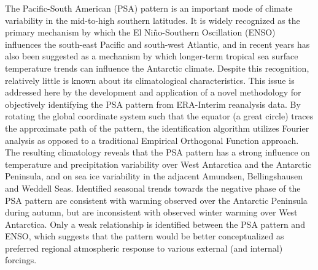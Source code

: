 The Pacific-South American (PSA) pattern is an important mode of climate variability in the mid-to-high southern latitudes. It is widely recognized as the primary mechanism by which the El Ni\~{n}o-Southern Oscillation (ENSO) influences the south-east Pacific and south-west Atlantic, and in recent years has also been suggested as a mechanism by which longer-term tropical sea surface temperature trends can influence the Antarctic climate. Despite this recognition, relatively little is known about its climatological characteristics. This issue is addressed here by the development and application of a novel methodology for objectively identifying the PSA pattern from ERA-Interim reanalysis data. By rotating the global coordinate system such that the equator (a great circle) traces the approximate path of the pattern, the identification algorithm utilizes Fourier analysis as opposed to a traditional Empirical Orthogonal Function approach. The resulting climatology reveals that the PSA pattern has a strong influence on temperature and precipitation variability over West Antarctica and the Antarctic Peninsula, and on sea ice variability in the adjacent Amundsen, Bellingshausen and Weddell Seas. Identified seasonal trends towards the negative phase of the PSA pattern are consistent with warming observed over the Antarctic Peninsula during autumn, but are inconsistent with observed winter warming over West Antarctica. Only a weak relationship is identified between the PSA pattern and ENSO, which suggests that the pattern would be better conceptualized as preferred regional atmospheric response to various external (and internal) forcings.